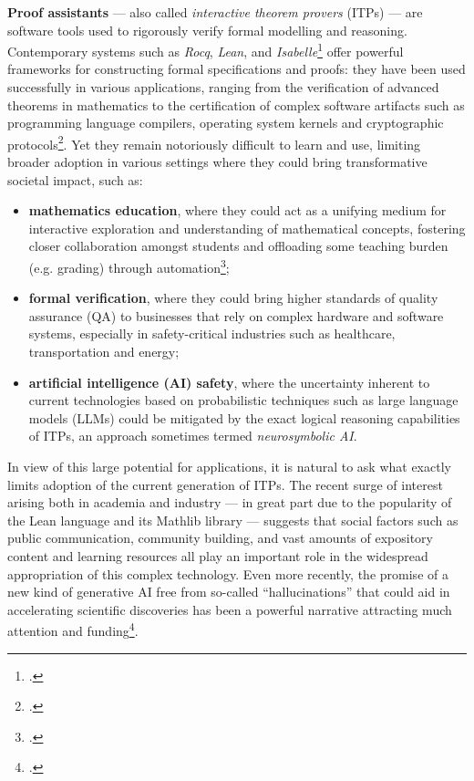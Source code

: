 \documentclass[12pt,draftproposal]{msca-pf}
\begin{document}
\textbf{Proof assistants} --- also called \emph{interactive theorem provers} (ITPs) --- are software
tools used to rigorously verify formal modelling and reasoning. Contemporary systems such as
\emph{Rocq}, \emph{Lean}, and
\emph{Isabelle}\footcite{the_rocq_development_team_2025_15149629,10.1007/978-3-030-79876-5_37,nipkow2002isabelle}
offer powerful frameworks for constructing formal specifications and proofs: they have been used
successfully in various applications, ranging from the verification of advanced theorems in
mathematics to the certification of complex software artifacts such as programming language
compilers, operating system kernels and cryptographic
protocols\footcite{gonthierFormalProofFour2008,leroyFormalVerificationRealistic2009,kleinSeL4FormalVerification2009,Barthe2014}.
Yet they remain notoriously difficult to learn and use, limiting broader adoption in various
settings where they could bring transformative societal impact, such as:
\begin{itemize}
    \item \textbf{mathematics education}, where they could act as a unifying medium for interactive
    exploration and understanding of mathematical concepts, fostering closer collaboration amongst
    students and offloading some teaching burden (e.g. grading) through
    automation\footcite{minhResearchReportProof2024};
    \item \textbf{formal verification}, where they could bring higher standards of quality assurance
    (QA) to businesses that rely on complex hardware and software systems, especially in
    safety-critical industries such as healthcare, transportation and energy;
    \item \textbf{artificial intelligence (AI) safety}, where the uncertainty inherent to current
    technologies based on probabilistic techniques such as large language models (LLMs) could be
    mitigated by the exact logical reasoning capabilities of ITPs, an approach sometimes termed
    \emph{neurosymbolic AI}.
\end{itemize}
In view of this large potential for applications, it is natural to ask what exactly limits adoption
of the current generation of ITPs. The recent surge of interest arising both in academia and
industry --- in great part due to the popularity of the Lean language and its Mathlib library ---
suggests that social factors such as public communication, community building, and vast amounts of
expository content and learning resources all play an important role in the widespread appropriation
of this complex technology. Even more recently, the promise of a new kind of generative AI free from
so-called ``hallucinations'' that could aid in accelerating scientific discoveries has been a
powerful narrative attracting much attention and funding\footcite{metzMathPathChatbots2024}.
\end{document}
